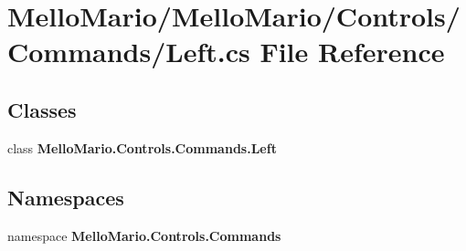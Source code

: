 \section{Mello\+Mario/\+Mello\+Mario/\+Controls/\+Commands/\+Left.cs File Reference}
\label{Left_8cs}
\subsection*{Classes}
\begin{DoxyCompactItemize}
\item 
class \textbf{ Mello\+Mario.\+Controls.\+Commands.\+Left}
\end{DoxyCompactItemize}
\subsection*{Namespaces}
\begin{DoxyCompactItemize}
\item 
namespace \textbf{ Mello\+Mario.\+Controls.\+Commands}
\end{DoxyCompactItemize}
